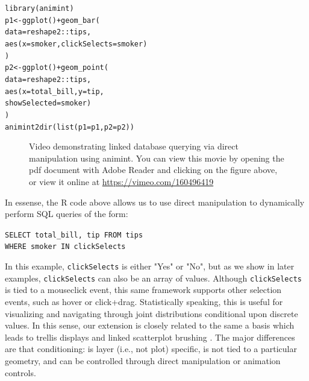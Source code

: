 \documentclass[journal]{vgtc}\usepackage[]{graphicx}\usepackage[]{color}
\makeatletter
\newcommand{\hlopt}[1]{\textcolor[rgb]{0,0,0}{#1}}%
\newcommand{\hlstd}[1]{\textcolor[rgb]{0,0,0}{#1}}%
\newcommand{\hlkwb}[1]{\textcolor[rgb]{0,0,0}{#1}}%
\newcommand{\hlkwc}[1]{\textcolor[rgb]{0,0,1}{#1}}%
\newcommand{\hlkwd}[1]{\textcolor[rgb]{0,0,0}{#1}}%
\newenvironment{kframe}{%
 \def\at@end@of@kframe{}%
 \ifinner\ifhmode%
  \def\at@end@of@kframe{\end{minipage}}%
  \begin{minipage}{\columnwidth}%
 \fi\fi%
 \def\FrameCommand##1{\hskip\@totalleftmargin \hskip-\fboxsep
 \colorbox{shadecolor}{##1}\hskip-\fboxsep
     \hskip-\linewidth \hskip-\@totalleftmargin \hskip\columnwidth}%
 \MakeFramed {\advance\hsize-\width
   \@totalleftmargin\z@ \linewidth\hsize
   \@setminipage}}%
 {\par\unskip\endMakeFramed%
 \at@end@of@kframe}
\newenvironment{knitrout}{}{} %
\makeatother
\begin{document}
\begin{knitrout}
\color{fgcolor}\begin{kframe}
\begin{alltt}
\hlkwd{library}\hlstd{(animint)}
\hlstd{p1} \hlkwb{<-} \hlkwd{ggplot}\hlstd{()} \hlopt{+} \hlkwd{geom_bar}\hlstd{(}
  \hlkwc{data} \hlstd{= reshape2}\hlopt{::}\hlstd{tips,}
  \hlkwd{aes}\hlstd{(}\hlkwc{x} \hlstd{= smoker,} \hlkwc{clickSelects} \hlstd{= smoker)}
\hlstd{)}
\hlstd{p2} \hlkwb{<-} \hlkwd{ggplot}\hlstd{()} \hlopt{+} \hlkwd{geom_point}\hlstd{(}
  \hlkwc{data} \hlstd{= reshape2}\hlopt{::}\hlstd{tips,}
  \hlkwd{aes}\hlstd{(}\hlkwc{x} \hlstd{= total_bill,} \hlkwc{y} \hlstd{= tip,}
      \hlkwc{showSelected} \hlstd{= smoker)}
\hlstd{)}
\hlkwd{animint2dir}\hlstd{(}\hlkwd{list}\hlstd{(}\hlkwc{p1} \hlstd{= p1,} \hlkwc{p2} \hlstd{= p2))}
\end{alltt}
\end{kframe}
\end{knitrout}

\begin{figure}[htp]
	\centerline{}
	\label{fig:tips}
	\caption{Video demonstrating linked database querying via direct manipulation using animint. You can view this movie by opening the pdf document with Adobe Reader and clicking on the figure above, or view it online at \url{https://vimeo.com/160496419}}
\end{figure}

In essense, the R code above allows us to use direct manipulation to dynamically
perform SQL queries of the form:

\vspace{0.3cm}
\texttt{SELECT total\_bill, tip FROM tips} \\
\hspace*{1cm} \texttt{WHERE smoker IN clickSelects}
\vspace{0.3cm}

In this example, \texttt{clickSelects} is either "Yes" or "No", but as we show 
in later examples, \texttt{clickSelects} can also be an array of values. 
Although \texttt{clickSelects} is tied to a mouseclick event, this same 
framework supports other selection events, such as hover or click+drag. 
Statistically speaking, this is useful for visualizing and navigating through 
joint distributions conditional upon discrete values. In this sense, our 
extension is closely related to the same a basis which leads to trellis 
displays \citep{trellis} and linked scatterplot brushing 
\citep{brushing-scatterplots}. The major differences are that conditioning: 
is layer (i.e., not plot) specific, is not tied to a particular geometry, and 
can be controlled through direct manipulation or animation controls.
\end{document}
